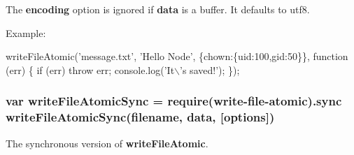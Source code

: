 The {\bfseries encoding} option is ignored if {\bfseries data} is a buffer. It defaults to \textquotesingle{}utf8\textquotesingle{}.

Example\+:


\begin{DoxyCode}
writeFileAtomic('message.txt', 'Hello Node', \{chown:\{uid:100,gid:50\}\}, function (err) \{
  if (err) throw err;
  console.log('It\(\backslash\)'s saved!');
\});
\end{DoxyCode}


\subsubsection*{var write\+File\+Atomic\+Sync = require(\textquotesingle{}write-\/file-\/atomic\textquotesingle{}).sync~\newline
write\+File\+Atomic\+Sync(filename, data, \mbox{[}options\mbox{]})}

The synchronous version of {\bfseries write\+File\+Atomic}. 